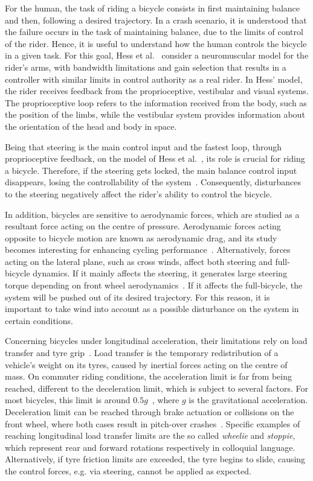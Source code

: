\documentclass{article}
\begin{document}
For the human, the task of riding a bicycle consists in first maintaining balance and then, following a desired trajectory.
%
In a crash scenario, it is understood that the failure occurs in the task of maintaining balance, due to the limits of control of the rider.
%
Hence, it is useful to understand how the human controls the bicycle in a given task.
%
For this goal, Hess et al.~\cite{Hes12} consider a neuromuscular model for the rider's arms, with bandwidth limitations and gain selection that results in a controller with similar limits in control authority as a real rider.
%
In Hess' model, the rider receives feedback from the proprioceptive, vestibular and visual systems.
%
The proprioceptive loop refers to the information received from the body, such as the position of the limbs, while the vestibular system provides information about the orientation of the head and body in space.


Being that steering is the main control input and the fastest loop, through proprioceptive feedback, on the model of Hess et al.~\cite{Hes12}, its role is crucial for riding a bicycle.
%
Therefore, if the steering gets locked, the main balance control input disappears, losing the controllability of the system~\cite{Koo11}.
%
Consequently, disturbances to the steering negatively affect the rider's ability to control the bicycle.


In addition, bicycles are sensitive to aerodynamic forces, which are studied as a resultant force acting on the centre of pressure.
%
Aerodynamic forces acting opposite to bicycle motion are known as aerodynamic drag, and its study becomes interesting for enhancing cycling performance~\cite{Deb11}.
%
Alternatively, forces acting on the lateral plane, such as cross winds, affect both steering and full-bicycle dynamics.
%
If it mainly affects the steering, it generates large steering torque depending on front wheel aerodynamics~\cite{Mao25}. 
%
If it affects the full-bicycle, the system will be pushed out of its desired trajectory.
%
For this reason, it is important to take wind into account as a possible disturbance on the system in certain conditions.


Concerning bicycles under longitudinal acceleration, their limitations rely on load transfer and tyre grip~\cite{Lot21}.
%
Load transfer is the temporary redistribution of a vehicle's weight on its tyres, caused by inertial forces acting on the centre of mass.
%
On commuter riding conditions, the acceleration limit is far from being reached, different to the deceleration limit, which is subject to several factors.
%
For most bicycles, this limit is around $ 0.5 g$~\cite{Bec04, Fam20}, where $g$ is the gravitational acceleration.
%
Deceleration limit can be reached through brake actuation or collisions on the front wheel, where both cases result in pitch-over crashes~\cite{Bre10}.
%
Specific examples of reaching longitudinal load transfer limits are the so called \textit{wheelie} and \textit{stoppie}, which represent rear and forward rotations respectively in colloquial language.
%
Alternatively, if tyre friction limits are exceeded, the tyre begins to slide, causing the control forces, e.g. via steering, cannot be applied as expected.
\end{document}
